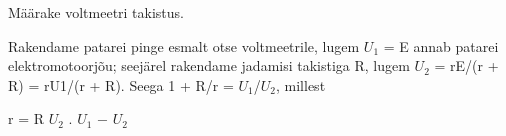 
Määrake voltmeetri takistus.

\hint

\solu
Rakendame patarei pinge esmalt otse voltmeetrile, lugem $U_1$ = E annab patarei elektromotoorjõu; seejärel rakendame jadamisi takistiga R, lugem $U_2$ = rE/(r + R) = rU1/(r + R). Seega 1 + R/r = $U_1$/$U_2$, millest

r = R $U_2$ . $U_1$ $-$ $U_2$
\probend
